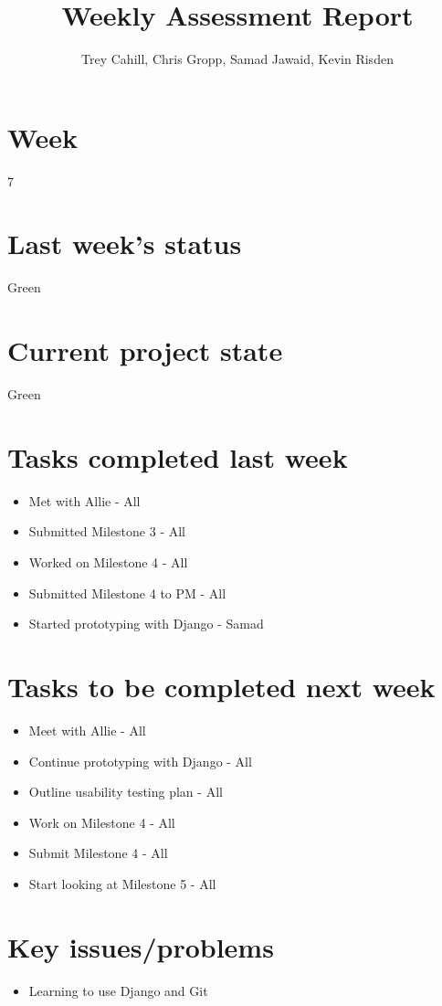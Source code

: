 \documentclass{article}
\title{Weekly Assessment Report}
\author{Trey Cahill, Chris Gropp, Samad Jawaid, Kevin Risden}
\begin{document}
\maketitle
\section{Week}
7
\section{Last week's status}
Green
\section{Current project state}
Green
\section{Tasks completed last week}
\begin{itemize}
\item Met with Allie - All
\item Submitted Milestone 3 - All
\item Worked on Milestone 4 - All
\item Submitted Milestone 4 to PM - All
\item Started prototyping with Django - Samad
\end{itemize}
\section{Tasks to be completed next week}
\begin{itemize}
\item Meet with Allie - All
\item Continue prototyping with Django - All
\item Outline usability testing plan - All
\item Work on Milestone 4 - All
\item Submit Milestone 4 - All
\item Start looking at Milestone 5 - All
\end{itemize}
\section{Key issues/problems}
\begin{itemize}
\item Learning to use Django and Git
\end{itemize}
\end{document}
